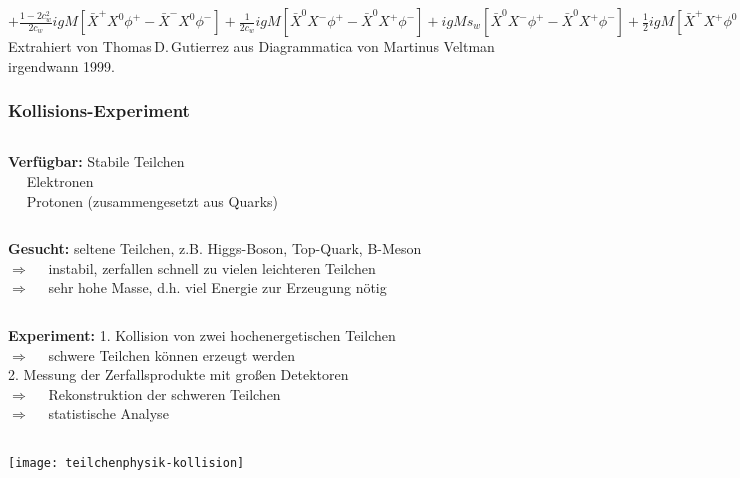 \documentclass[10pt,t]{beamer}
\begin{document}
\begin{frame}
{\begin{minipage}{17cm}
\begin{math}
            +\frac{1-2c^{2}_{w}}{2c_{w}}igM[\bar{X}^{+}X^{0}\phi^{+}-\bar{X}^{-}X^{0}\phi^{-}]
            +\frac{1}{2c_{w}}igM[\bar{X}^{0}X^{-}\phi^{+}-\bar{X}^{0}X^{+}\phi^{-}]
            +igMs_{w}[\bar{X}^{0}X^{-}\phi^{+}-\bar{X}^{0}X^{+}\phi^{-}]
            +\frac{1}{2}igM[\bar{X}^{+}X^{+}\phi^{0}-\bar{X}^{-}X^{-}\phi^{0}]
        \end{math}
        \\[2ex]
        Extrahiert von Thomas\,D.\,Gutierrez aus Diagrammatica von Martinus Veltman irgendwann 1999.\cite{web:stml}
    \end{minipage}
}
\end{frame}


\begin{frame}
\frametitle{Kollisions-Experiment}
\vspace*{-2\baselineskip}
\begin{columns}
\textbf{Verfügbar:}
Stabile Teilchen \\
    \qquad\textbullet~~ Elektronen \\
    \qquad\textbullet~~ Protonen (zusammengesetzt aus Quarks)
\end{columns}
\vspace*{1ex}
\begin{columns}
\textbf{Gesucht:}
seltene Teilchen, z.B. Higgs-Boson, Top-Quark, B-Meson \\
    \qquad$\Rightarrow$~~ instabil, zerfallen schnell zu vielen leichteren Teilchen \\
    \qquad$\Rightarrow$~~ sehr hohe Masse, d.h. viel Energie zur Erzeugung nötig
\end{columns}
\vspace*{1ex}
\begin{columns}
\textbf{Experiment:}
1. Kollision von zwei hochenergetischen Teilchen \\
    \qquad$\Rightarrow$~~ schwere Teilchen können erzeugt werden \\[1ex]
    2. Messung der Zerfallsprodukte mit großen Detektoren \\
    \qquad$\Rightarrow$~~ Rekonstruktion der schweren Teilchen \\
    \qquad$\Rightarrow$~~ statistische Analyse
\end{columns}
\vspace*{1ex}
\texttt{[image: teilchenphysik-kollision]}
\end{frame}
\end{document}
